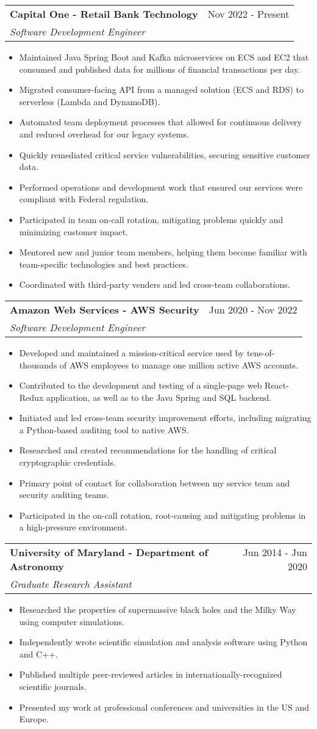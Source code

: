 \documentclass[letterpaper,11pt]{article}
\makeatletter
\newlength{\outerbordwidth}
\newcommand{\resitem}[1]{\item #1 \vspace{-4pt}}
\newcommand{\resheading}[1]{\vspace{1pt}
  \parbox{\textwidth}{\setlength{\FrameSep}{\outerbordwidth}
    \begin{shaded}
\setlength{\fboxsep}{0pt}\framebox[\textwidth][l]{\setlength{\fboxsep}{4pt}\fcolorbox{shadecolorB}{shadecolorB}{\textbf{\sffamily{\mbox{~}\makebox[7.25in][l]{\large #1} \vphantom{p\^{E}}}}}}
    \end{shaded}
  }\vspace{-5pt}
}
\newcommand{\ressubheading}[4]{
\begin{tabular*}{7.5in}{l@{\cftdotfill{\cftsecdotsep}\extracolsep{\fill}}r}
		\textbf{#1} & #2 \\
		\textit{#3} & \textit{#4} \\
\end{tabular*}\vspace{-6pt}}
\makeatother
\begin{document}
\resheading{Work Experience}
\ressubheading{Capital One - Retail Bank Technology}{Nov 2022 - Present}{Software Development Engineer}{}
\begin{itemize}
	\resitem{Maintained Java Spring Boot and Kafka microservices on ECS and EC2 that consumed and published data for millions of financial transactions per day.}
	\resitem{Migrated consumer-facing API from a managed solution (ECS and RDS) to serverless (Lambda and DynamoDB).}
	\resitem{Automated team deployment processes that allowed for continuous delivery and reduced overhead for our legacy systems.}
	\resitem{Quickly remediated critical service vulnerabilities, securing sensitive customer data.}
	\resitem{Performed operations and development work that ensured our services were compliant with Federal regulation.}
	\resitem{Participated in team on-call rotation, mitigating problems quickly and minimizing customer impact.}
	\resitem{Mentored new and junior team members, helping them become familiar with team-specific technologies and best practices.}
	\resitem{Coordinated with third-party venders and led cross-team collaborations.}
\end{itemize}
\ressubheading{Amazon Web Services - AWS Security}{Jun 2020 - Nov 2022}{Software Development Engineer}{}
\begin{itemize}
	\resitem{Developed and maintained a mission-critical service used by tens-of-thousands of AWS employees to manage one million active AWS accounts.}
	\resitem{Contributed to the development and testing of a single-page web React-Redux application, as well as to the Java Spring and SQL backend.}
	\resitem{Initiated and led cross-team security improvement efforts, including migrating a Python-based auditing tool to native AWS.}
	\resitem{Researched and created recommendations for the handling of critical cryptographic credentials.}
	\resitem{Primary point of contact for collaboration between my service team and security auditing teams.}
	\resitem{Participated in the on-call rotation, root-causing and mitigating problems in a high-pressure environment.}
\end{itemize}
\ressubheading{University of Maryland - Department of Astronomy}{Jun 2014 - Jun 2020}{Graduate Research Assistant}{}
\begin{itemize}
	\resitem{Researched the properties of supermassive black holes and the Milky Way using computer simulations.}
	\resitem{Independently wrote scientific simulation and analysis software using Python and C++.}
	\resitem{Published multiple peer-reviewed articles in internationally-recognized scientific journals.}
	\resitem{Presented my work at professional conferences and universities in the US and Europe.}
\end{itemize}
\end{document}
